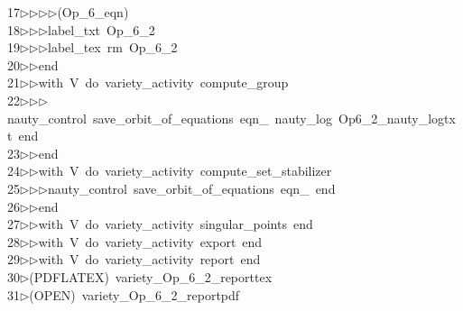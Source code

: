 \begin{tabbing}
17\>$\triangleright$\>$\triangleright$\>$\triangleright$\>$\triangleright$\>(Op\_6\_eqn)\ \\[0pt]
18\>$\triangleright$\>$\triangleright$\>$\triangleright$\>label\_txt\ Op\_6\_2\ \\[0pt]
19\>$\triangleright$\>$\triangleright$\>$\triangleright$\>label\_tex\ rm\ Op\_6\_2\ \\[0pt]
20\>$\triangleright$\>$\triangleright$\>end\ \\[0pt]
21\>$\triangleright$\>$\triangleright$\>with\ V\ do\ variety\_activity\ compute\_group\ \\[0pt]
22\>$\triangleright$\>$\triangleright$\>$\triangleright$\>nauty\_control\ save\_orbit\_of\_equations\ eqn\_\ nauty\_log\ Op6\_2\_nauty\_logtx\\[0pt]
\>t\ end\ \\[0pt]
23\>$\triangleright$\>$\triangleright$\>end\ \\[0pt]
24\>$\triangleright$\>$\triangleright$\>with\ V\ do\ variety\_activity\ compute\_set\_stabilizer\ \\[0pt]
25\>$\triangleright$\>$\triangleright$\>$\triangleright$\>nauty\_control\ save\_orbit\_of\_equations\ eqn\_\ end\ \\[0pt]
26\>$\triangleright$\>$\triangleright$\>end\ \\[0pt]
27\>$\triangleright$\>$\triangleright$\>with\ V\ do\ variety\_activity\ singular\_points\ end\ \\[0pt]
28\>$\triangleright$\>$\triangleright$\>with\ V\ do\ variety\_activity\ export\ end\ \\[0pt]
29\>$\triangleright$\>$\triangleright$\>with\ V\ do\ variety\_activity\ report\ end\\[0pt]
30\>$\triangleright$\>(PDFLATEX)\ variety\_Op\_6\_2\_reporttex\\[0pt]
31\>$\triangleright$\>(OPEN)\ variety\_Op\_6\_2\_reportpdf\\[0pt]

\end{tabbing}
